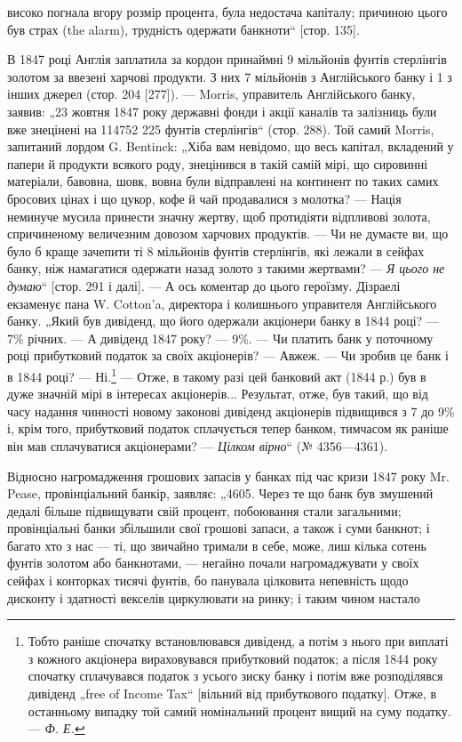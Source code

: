\parcont{}  %
високо погнала вгору розмір процента, була недостача капіталу;
причиною цього був страх (the alarm), трудність одержати банкноти“ [стор. 135].

В 1847 році Англія заплатила за кордон принаймні 9 мільйонів фунтів стерлінгів золотом за ввезені
харчові продукти.
З них 7  мільйонів з Англійського банку і 1  з інших джерел
(стор. 204 [277]). — Morris, управитель Англійського банку, заявив:
„23 жовтня 1847 року державні фонди і акції каналів та залізниць
були вже знецінені на 114752 225 фунтів стерлінгів“ (стор. 288).
Той самий Morris, запитаний лордом G. Bentinck: „Хіба вам невідомо, що весь капітал, вкладений у
папери й продукти всякого роду, знецінився в такій самій мірі, що сировинні матеріали,
бавовна, шовк, вовна були відправлені на континент по таких самих
бросових цінах і що цукор, кофе й чай продавалися з молотка? —
Нація неминуче мусила принести значну жертву, щоб протидіяти
відпливові золота, спричиненому величезним довозом харчових
продуктів. — Чи не думаєте ви, що було б краще зачепити ті
8 мільйонів фунтів стерлінгів, які лежали в сейфах банку, ніж
намагатися одержати назад золото з такими жертвами? — \emph{Я цього
не думаю}“ [стор. 291 і далі]. — А ось коментар до цього героїзму. Дізраелі екзаменує пана W.
Cotton’a, директора і колишнього
управителя Англійського банку. „Який був дивіденд, що його
одержали акціонери банку в 1844 році? — 7\% річних. — А дивіденд 1847 року? — 9\%. — Чи платить банк у
поточному році прибутковий податок за своїх акціонерів? — Авжеж. — Чи зробив
це банк і в 1844 році? — Ні.\footnote{
Тобто раніше спочатку встановлювався дивіденд, а потім з нього при
виплаті з кожного акціонера вираховувався прибутковий податок; а після
1844 року спочатку сплачувався податок з усього зиску банку і потім вже
розподілявся дивіденд „free of Income Tax“ [вільний від прибуткового податку].
Отже, в останньому випадку той самий номінальний процент вищий на суму
податку. — \emph{Ф. Е.}
} — Отже, в такому разі цей банковий
акт (1844 р.) був в дуже значній мірі в інтересах акціонерів...
Результат, отже, був такий, що від часу надання чинності новому законові дивіденд акціонерів
підвищився з 7 до 9\% і,
крім того, прибутковий податок сплачується тепер банком, тимчасом як раніше він мав сплачуватися
акціонерами? — \emph{Цілком
вірно}“ (№ 4356—4361).

Відносно нагромадження грошових запасів у банках під час
кризи 1847 року Mr. Pease, провінціальний банкір, заявляє: „4605.
Через те що банк був змушений дедалі більше підвищувати
свій процент, побоювання стали загальними; провінціальні банки
збільшили свої грошові запаси, а також і суми банкнот; і багато хто з нас — ті, що звичайно тримали
в себе, може, лиш
кілька сотень фунтів золотом або банкнотами, — негайно почали нагромаджувати у своїх сейфах і
конторках тисячі фунтів, бо панувала цілковита непевність щодо дисконту і здатності векселів
циркулювати на ринку; і таким чином настало
\parbreak{}  %
